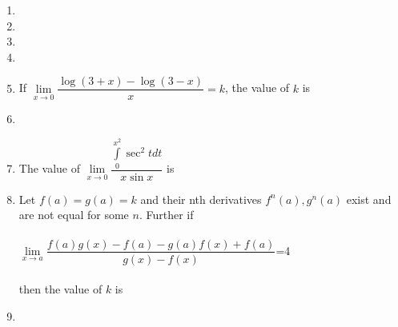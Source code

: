 \begin{enumerate}[label=\arabic*.,ref=\thesubsection.\theenumi]
\item {} \item[~] \item[~]
\begin{itemize}
\end{itemize}\item[~]

\item If $\lim\limits_{x \to 0}\dfrac{\log(3+x)-\log(3-x)}{x}=k$, the value of $k$ is
\begin{itemize}
\end{itemize} \item[~]

\item The value of $\lim\limits_{x \to 0}\dfrac{\int\limits_0^{x^2}\sec^2tdt}{x\sin x}$ is
\begin{itemize}
\end{itemize}

\item Let $f(a)=g(a)=k$ and their nth derivatives $f^n(a),g^n(a)$ exist and are not equal for some $n$. Further if \\ \\
$\lim\limits_{x \to a}\dfrac{f(a)g(x)-f(a)-g(a)f(x)+f(a)}{g(x)-f(x)}$=4 \\ \\ then the value of $k$ is
\begin{itemize}
\end{itemize}\item[~]


\end{enumerate}
